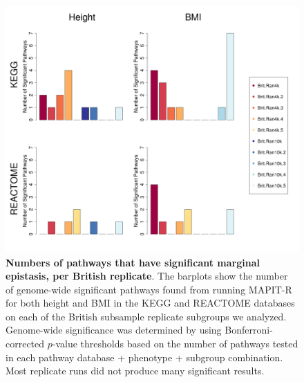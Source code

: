 \documentclass[12pt,a4paper]{article}
\begin{document}
\begin{figure}[htbp]
\centering
\hspace*{-1.75cm}
\includegraphics[scale=.45]{Images/Supp/InterPath_Supp_Figure_BritReps_Barplot_vs3.png}
\caption[TBD]{\textbf{Numbers of pathways that have significant marginal epistasis, per British replicate}. The barplots show the number of genome-wide significant pathways found from running MAPIT-R for both height and BMI in the KEGG and REACTOME databases on each of the British subsample replicate subgroups we analyzed. Genome-wide significance was determined by using Bonferroni-corrected $p$-value thresholds based on the number of pathways tested in each pathway database + phenotype + subgroup combination. Most replicate runs did not produce many significant results.}
\label{InterPath-Supp-Figure-BritReps-Barplots}
\end{figure}
\clearpage
\end{document}
